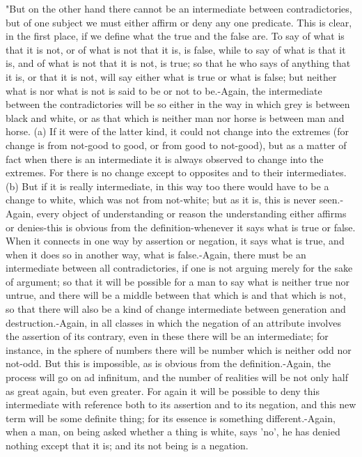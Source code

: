 "But on the other hand there cannot be an intermediate between contradictories,
but of one subject we must either affirm or deny any one predicate.
This is clear, in the first place, if we define what the true and
the false are. To say of what is that it is not, or of what is not
that it is, is false, while to say of what is that it is, and of what
is not that it is not, is true; so that he who says of anything that
it is, or that it is not, will say either what is true or what is
false; but neither what is nor what is not is said to be or not to
be.-Again, the intermediate between the contradictories will be so
either in the way in which grey is between black and white, or as
that which is neither man nor horse is between man and horse. (a)
If it were of the latter kind, it could not change into the extremes
(for change is from not-good to good, or from good to not-good), but
as a matter of fact when there is an intermediate it is always observed
to change into the extremes. For there is no change except to opposites
and to their intermediates. (b) But if it is really intermediate,
in this way too there would have to be a change to white, which was
not from not-white; but as it is, this is never seen.-Again, every
object of understanding or reason the understanding either affirms
or denies-this is obvious from the definition-whenever it says what
is true or false. When it connects in one way by assertion or negation,
it says what is true, and when it does so in another way, what is
false.-Again, there must be an intermediate between all contradictories,
if one is not arguing merely for the sake of argument; so that it
will be possible for a man to say what is neither true nor untrue,
and there will be a middle between that which is and that which is
not, so that there will also be a kind of change intermediate between
generation and destruction.-Again, in all classes in which the negation
of an attribute involves the assertion of its contrary, even in these
there will be an intermediate; for instance, in the sphere of numbers
there will be number which is neither odd nor not-odd. But this is
impossible, as is obvious from the definition.-Again, the process
will go on ad infinitum, and the number of realities will be not only
half as great again, but even greater. For again it will be possible
to deny this intermediate with reference both to its assertion and
to its negation, and this new term will be some definite thing; for
its essence is something different.-Again, when a man, on being asked
whether a thing is white, says 'no', he has denied nothing except
that it is; and its not being is a negation. 

